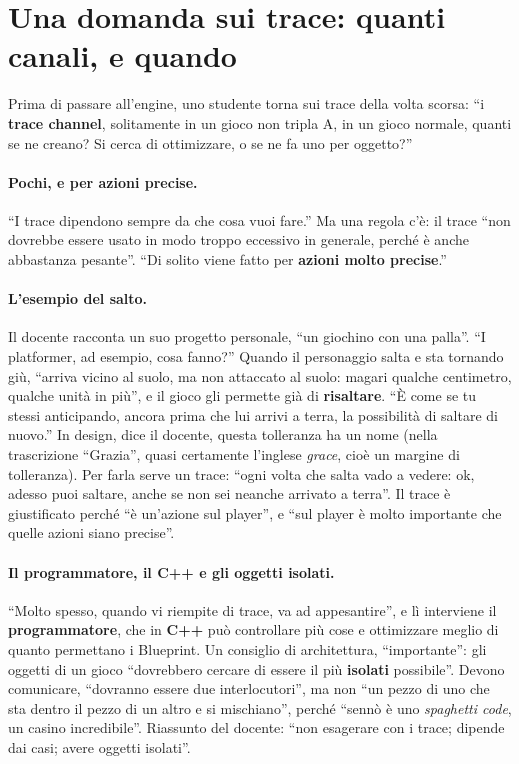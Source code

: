 \section{Una domanda sui trace: quanti canali, e quando}
\label{ue6:sec:domandatrace}

Prima di passare all'engine, uno studente torna sui trace della volta scorsa: ``i
\textbf{trace channel}, solitamente in un gioco non tripla A, in un gioco normale, quanti
se ne creano? Si cerca di ottimizzare, o se ne fa uno per oggetto?''

\paragraph{Pochi, e per azioni precise.} ``I trace dipendono sempre da che cosa vuoi
fare.'' Ma una regola c'è: il trace ``non dovrebbe essere usato in modo troppo eccessivo
in generale, perché è anche abbastanza pesante''. ``Di solito viene fatto per
\textbf{azioni molto precise}.''

\paragraph{L'esempio del salto.} Il docente racconta un suo progetto personale, ``un
giochino con una palla''. ``I platformer, ad esempio, cosa fanno?'' Quando il personaggio
salta e sta tornando giù, ``arriva vicino al suolo, ma non attaccato al suolo: magari
qualche centimetro, qualche unità in più'', e il gioco gli permette già di
\textbf{risaltare}. ``È come se tu stessi anticipando, ancora prima che lui arrivi a
terra, la possibilità di saltare di nuovo.'' In design, dice il docente, questa
tolleranza ha un nome (nella trascrizione ``Grazia'', quasi certamente l'inglese
\emph{grace}, cioè un margine di tolleranza). Per farla serve un trace: ``ogni volta che
salta vado a vedere: ok, adesso puoi saltare, anche se non sei neanche arrivato a
terra''. Il trace è giustificato perché ``è un'azione sul player'', e ``sul player è
molto importante che quelle azioni siano precise''.

\paragraph{Il programmatore, il C++ e gli oggetti isolati.} ``Molto spesso, quando vi
riempite di trace, va ad appesantire'', e lì interviene il \textbf{programmatore}, che in
\textbf{C++} può controllare più cose e ottimizzare meglio di quanto permettano i
Blueprint. Un consiglio di architettura, ``importante'': gli oggetti di un gioco
``dovrebbero cercare di essere il più \textbf{isolati} possibile''. Devono comunicare,
``dovranno essere due interlocutori'', ma non ``un pezzo di uno che sta dentro il pezzo
di un altro e si mischiano'', perché ``sennò è uno \emph{spaghetti code}, un casino
incredibile''. Riassunto del docente: ``non esagerare con i trace; dipende dai casi;
avere oggetti isolati''.

